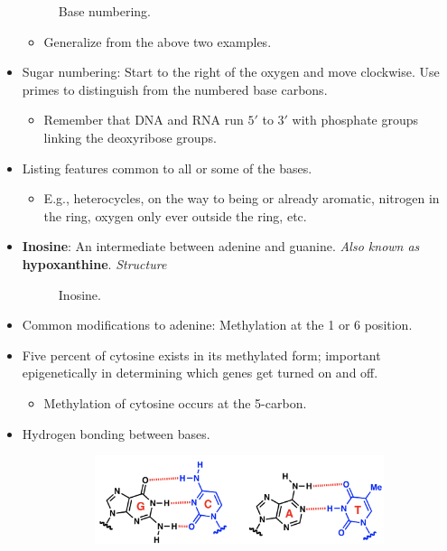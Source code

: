 \documentclass[../notes.tex]{subfiles}
\begin{document}
\begin{itemize}
\begin{figure}[h!]
        \caption{Base numbering.}
        \label{fig:baseNumbering}
    \end{figure}
    \begin{itemize}
        \item Generalize from the above two examples.
    \end{itemize}
    \item Sugar numbering: Start to the right of the oxygen and move clockwise. Use primes to distinguish from the numbered base carbons.
    \begin{itemize}
        \item Remember that DNA and RNA run $5'$ to $3'$ with phosphate groups linking the deoxyribose groups.
    \end{itemize}
    \item Listing features common to all or some of the bases.
    \begin{itemize}
        \item E.g., heterocycles, on the way to being or already aromatic, nitrogen in the ring, oxygen only ever outside the ring, etc.
    \end{itemize}
    \item \textbf{Inosine}: An intermediate between adenine and guanine. \emph{Also known as} \textbf{hypoxanthine}. \emph{Structure}
    \begin{figure}[h!]
        \centering
        \footnotesize
        \caption{Inosine.}
        \label{fig:inosine}
    \end{figure}
    \item Common modifications to adenine: Methylation at the 1 or 6 position.
    \item Five percent of cytosine exists in its methylated form; important epigenetically in determining which genes get turned on and off.
    \begin{itemize}
        \item Methylation of cytosine occurs at the 5-carbon.
    \end{itemize}
    \item Hydrogen bonding between bases.
    \begin{figure}[H]
        \centering
        \begin{subfigure}[b]{0.45\linewidth}
            \centering
            \includegraphics[width=\linewidth]{../ExtFiles/hBondinga.png}

\end{subfigure}
\end{figure}
\end{itemize}
\end{document}
